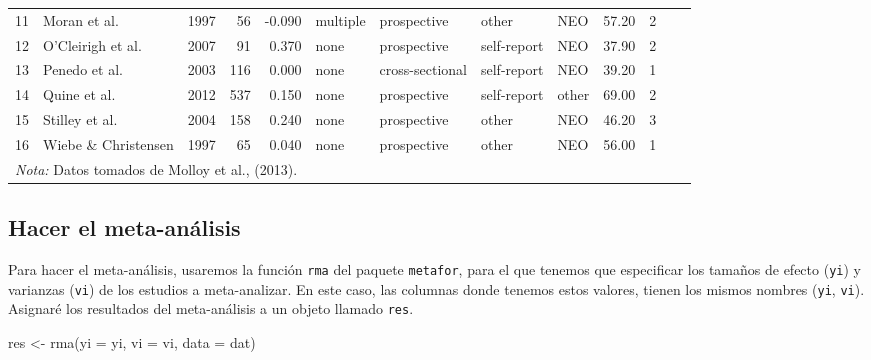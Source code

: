 \documentclass[
]{article}
\newenvironment{Shaded}{\begin{snugshade}}{\end{snugshade}}
\newcommand{\AttributeTok}[1]{\textcolor[rgb]{0.80,0.80,0.80}{#1}}
\newcommand{\FunctionTok}[1]{\textcolor[rgb]{0.94,0.94,0.56}{#1}}
\newcommand{\NormalTok}[1]{\textcolor[rgb]{0.80,0.80,0.80}{#1}}
\newcommand{\OtherTok}[1]{\textcolor[rgb]{0.94,0.94,0.56}{#1}}
\begin{document}
\begin{table}[H]
{\begin{tabular}[t]{rlrrrllllrr>{}r>{}r}
11 & Moran et al. & 1997 & 56 & -0.090 & multiple & prospective & other & NEO & 57.20 & 2 & \cellcolor[HTML]{c4c4c4}{-0.0902442} & \cellcolor[HTML]{c4c4c4}{0.0188679}\\
12 & O'Cleirigh et al. & 2007 & 91 & 0.370 & none & prospective & self-report & NEO & 37.90 & 2 & \cellcolor[HTML]{c4c4c4}{0.3884231} & \cellcolor[HTML]{c4c4c4}{0.0113636}\\
13 & Penedo et al. & 2003 & 116 & 0.000 & none & cross-sectional & self-report & NEO & 39.20 & 1 & \cellcolor[HTML]{c4c4c4}{0.0000000} & \cellcolor[HTML]{c4c4c4}{0.0088496}\\
14 & Quine et al. & 2012 & 537 & 0.150 & none & prospective & self-report & other & 69.00 & 2 & \cellcolor[HTML]{c4c4c4}{0.1511404} & \cellcolor[HTML]{c4c4c4}{0.0018727}\\
15 & Stilley et al. & 2004 & 158 & 0.240 & none & prospective & other & NEO & 46.20 & 3 & \cellcolor[HTML]{c4c4c4}{0.2447741} & \cellcolor[HTML]{c4c4c4}{0.0064516}\\
16 & Wiebe \& Christensen & 1997 & 65 & 0.040 & none & prospective & other & NEO & 56.00 & 1 & \cellcolor[HTML]{c4c4c4}{0.0400214} & \cellcolor[HTML]{c4c4c4}{0.0161290}\\
\bottomrule
\multicolumn{13}{l}{\rule{0pt}{1em}\textit{Nota:} Datos tomados de Molloy et al., (2013).}\\
\end{tabular}}
\end{table}

\hypertarget{hacer-el-meta-anuxe1lisis}{%
\subsection{Hacer el meta-análisis}\label{hacer-el-meta-anuxe1lisis}}

Para hacer el meta-análisis, usaremos la función \texttt{rma} del
paquete \texttt{metafor}, para el que tenemos que especificar los
tamaños de efecto (\texttt{yi}) y varianzas (\texttt{vi}) de los
estudios a meta-analizar. En este caso, las columnas donde tenemos estos
valores, tienen los mismos nombres (\texttt{yi}, \texttt{vi}). Asignaré
los resultados del meta-análisis a un objeto llamado \texttt{res}.

\begin{Shaded}
\begin{Highlighting}[]
\NormalTok{res }\OtherTok{\textless{}{-}} \FunctionTok{rma}\NormalTok{(}\AttributeTok{yi =}\NormalTok{ yi, }\AttributeTok{vi =}\NormalTok{ vi, }\AttributeTok{data =}\NormalTok{ dat)}
\end{Highlighting}
\end{Shaded}
\end{document}

